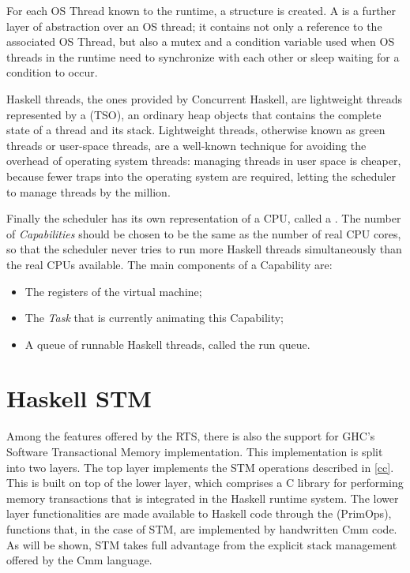 For each OS Thread known to the runtime, a  structure is created. A  is a further layer of abstraction over an OS thread; it contains not only a reference to the associated OS Thread, but also a mutex and a condition variable used when OS threads in the runtime need to synchronize with each other or sleep waiting for a condition to occur.

Haskell threads, the ones provided by Concurrent Haskell, are lightweight threads represented by a  (TSO), an ordinary heap objects that contains the complete state of a thread and its stack.
Lightweight threads, otherwise known as green threads or user-space threads,
are a well-known technique for avoiding the overhead of operating system threads: managing threads in user space is cheaper, because fewer traps into the operating system are required, letting the scheduler to manage threads by the million.

Finally the scheduler has its own representation of a CPU, called a . The number of \emph{Capabilities} should be  chosen to be the same as the number of real CPU cores, so that the scheduler never tries to run more Haskell threads simultaneously than the real CPUs available.
The main components of a Capability are:
\begin{itemize}
\item The registers of the virtual machine;
\item The \emph{Task} that is currently animating this Capability;
\item A queue of runnable Haskell threads, called the run queue.
\end{itemize}

\section{Haskell STM}
Among the features offered by the RTS, there is also the support for GHC's Software Transactional Memory implementation.
This implementation is split into two layers.
The top layer implements the STM operations described in \ref{cc}.
This is built on top of the lower layer, which comprises a C library for performing memory transactions that is integrated in the Haskell runtime system.
The lower layer functionalities are made available to Haskell code through the  (PrimOps), \ie functions that, in the case of STM, are implemented by handwritten Cmm code. 
As will be shown, STM takes full advantage from the explicit stack management offered by the Cmm language.

